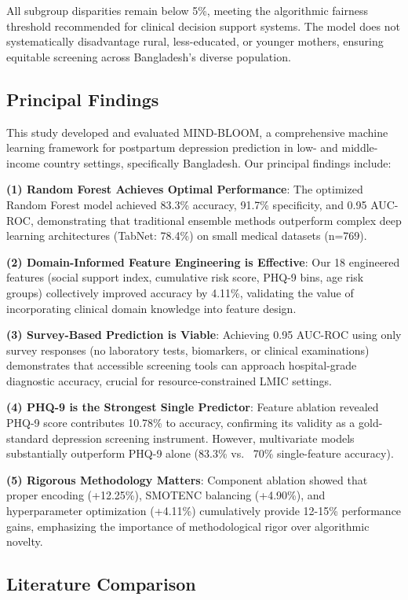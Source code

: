 All subgroup disparities remain below 5\%, meeting the algorithmic fairness threshold recommended for clinical decision support systems. The model does not systematically disadvantage rural, less-educated, or younger mothers, ensuring equitable screening across Bangladesh's diverse population.

\subsection{Principal Findings}

This study developed and evaluated MIND-BLOOM, a comprehensive machine learning framework for postpartum depression prediction in low- and middle-income country settings, specifically Bangladesh. Our principal findings include:

\textbf{(1) Random Forest Achieves Optimal Performance}: The optimized Random Forest model achieved 83.3\% accuracy, 91.7\% specificity, and 0.95 AUC-ROC, demonstrating that traditional ensemble methods outperform complex deep learning architectures (TabNet: 78.4\%) on small medical datasets (n=769).

\textbf{(2) Domain-Informed Feature Engineering is Effective}: Our 18 engineered features (social support index, cumulative risk score, PHQ-9 bins, age risk groups) collectively improved accuracy by 4.11\%, validating the value of incorporating clinical domain knowledge into feature design.

\textbf{(3) Survey-Based Prediction is Viable}: Achieving 0.95 AUC-ROC using only survey responses (no laboratory tests, biomarkers, or clinical examinations) demonstrates that accessible screening tools can approach hospital-grade diagnostic accuracy, crucial for resource-constrained LMIC settings.

\textbf{(4) PHQ-9 is the Strongest Single Predictor}: Feature ablation revealed PHQ-9 score contributes 10.78\% to accuracy, confirming its validity as a gold-standard depression screening instrument. However, multivariate models substantially outperform PHQ-9 alone (83.3\% vs. ~70\% single-feature accuracy).

\textbf{(5) Rigorous Methodology Matters}: Component ablation showed that proper encoding (+12.25\%), SMOTENC balancing (+4.90\%), and hyperparameter optimization (+4.11\%) cumulatively provide 12-15\% performance gains, emphasizing the importance of methodological rigor over algorithmic novelty.

\subsection{Literature Comparison}

